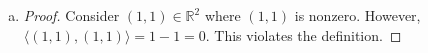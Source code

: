 \begin{Exercise}
\begin{enumerate}[(a)]
\item
\begin{proof}
Consider $(1,1)\in\mathbb{R}^2$ where $(1,1)$ is nonzero. However, $\langle (1,1),(1,1) \rangle = 1-1 = 0$. This violates the definition. 
\end{proof}
\end{enumerate}
\end{Exercise}